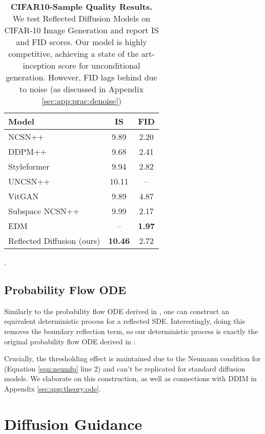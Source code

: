 \documentclass{article}
\theoremstyle{plain}
\theoremstyle{definition}
\theoremstyle{remark}
\begin{document}
\begin{table}[t]
    \centering
    \begin{tabular}{l c c}
        Model & IS  & FID \\
        \hline
        NCSN++ \citep{Song2020ScoreBasedGM} & 9.89 & 2.20\\
        DDPM++ \citep{Song2020ScoreBasedGM} & 9.68 & 2.41\\
        Styleformer \citep{Park2021StyleformerTB} & 9.94 & 2.82\\
        UNCSN++ \citep{Kim2021SoftTA} & 10.11 & --\\
        VitGAN \citep{Lee2021ViTGANTG} & 9.89 & 4.87\\
        Subspace NCSN++ \citep{Jing2022SubspaceDG} & 9.99 & 2.17\\
        EDM \citep{Karras2022ElucidatingTD} & -- & \textbf{1.97}\\
        \hline
        Reflected Diffusion (ours) & \textbf{10.46} & 2.72\\
    \end{tabular}
    \caption{\textbf{CIFAR10-Sample Quality Results.} We test Reflected Diffusion Models on CIFAR-10 Image Generation and report IS and FID scores. Our model is highly competitive, achieving a state of the art-inception score for unconditional generation. However, FID lags behind due to noise (as discussed in Appendix \ref{sec:app:prac:denoise})}.
    \label{tab:cifar10results}
    \vspace{-5mm}
\end{table}

\subsection{Probability Flow ODE}

Similarly to the probability flow ODE derived in \citet{Song2020ScoreBasedGM}, one can construct an equivalent deterministic process for a reflected SDE. Interestingly, doing this removes the boundary reflection term, so our deterministic process is exactly the original probability flow ODE derived in \citet{Song2020ScoreBasedGM}:

Crucially, the thresholding effect is maintained due to the Neumann condition for  (Equation \ref{eqn:neumfp} line 2) and can't be replicated for standard diffusion models. We elaborate on this construction, as well as connections with DDIM \citep{Song2020DenoisingDI} in Appendix \ref{sec:app:theory:ode}.
  \section{Diffusion Guidance}
\end{document}
